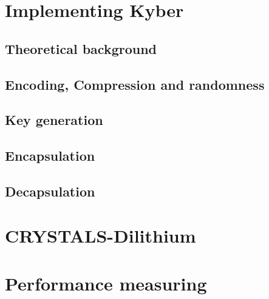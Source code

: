 \section{Implementing Kyber}
\label{sec:implementing_kyber}


\subsection{Theoretical background}
\label{subsec:kyber_theroteical}


\subsection{Encoding, Compression and randomness}
\label{subsec:kyber_enc_compr}


\subsection{Key generation}
\label{subsec:kyber_keygen}


\subsection{Encapsulation}
\label{subsec:kyber_enc}


\subsection{Decapsulation}
\label{subsec:kyber_dec}


\section{CRYSTALS-Dilithium}
\label{sec:dilithium}



\section{Performance measuring}
\label{sec:lattice_performance_measuring}


